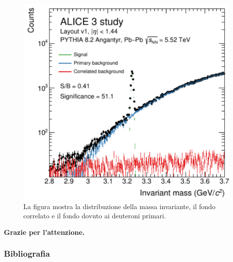 \documentclass[11pt]{beamer}
\begin{document}
	\begin{frame}		
		\begin{figure}		
			\centering
			\includegraphics[width=0.5\linewidth]{pictures/ALICE_c-d_detection_2.png}
			\caption{La figura mostra la distribuzione della massa invariante, il fondo correlato e il fondo dovuto ai deuteroni primari.}
			\label{fig:QCD_vertices} 
		\end{figure}
	\end{frame}
	
	\begin{frame}
		\centering
		\Huge{\textbf{Grazie per l'attenzione.}}\\[2ex]
	\end{frame}
	
	\begin{frame}
		\frametitle{Bibliografia}
		\printbibliography
	\end{frame}
	
	
	
\end{document}
